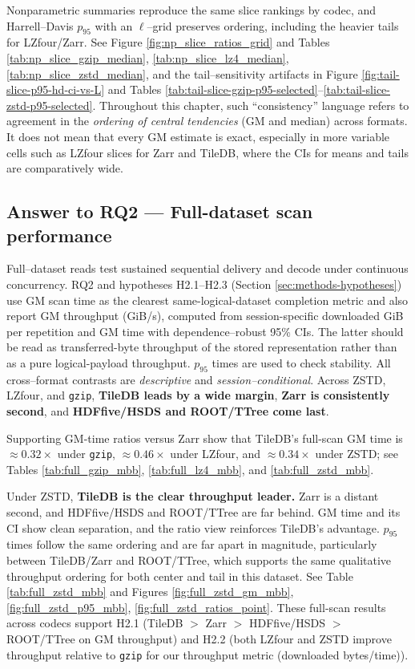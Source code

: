 \documentclass[nomenclature, english, bibtex]{kththesis}
\numberwithin{listing}{chapter}
\begin{document}
Nonparametric summaries reproduce the same slice rankings by codec, and Harrell–Davis $p_{95}$ with an $\ell$–grid preserves ordering, including the heavier tails for \gls{LZfour}/Zarr. See Figure \ref{fig:np_slice_ratios_grid} and Tables \ref{tab:np_slice_gzip_median}, \ref{tab:np_slice_lz4_median}, \ref{tab:np_slice_zstd_median}, and the tail–sensitivity artifacts in Figure \ref{fig:tail-slice-p95-hd-ci-vs-L} and Tables \ref{tab:tail-slice-gzip-p95-selected}–\ref{tab:tail-slice-zstd-p95-selected}. Throughout this chapter, such “consistency” language refers to agreement in the \emph{ordering of central tendencies} (\gls{GM} and median) across formats. It does not mean that every \gls{GM} estimate is exact, especially in more variable cells such as \gls{LZfour} slices for Zarr and TileDB, where the CIs for means and tails are comparatively wide.

\subsection{Answer to RQ2 — Full-dataset scan performance}
\label{sec:ans-rq2}
Full–dataset reads test sustained sequential delivery and decode under continuous concurrency. RQ2 and hypotheses H2.1–H2.3 (Section \ref{sec:methods-hypotheses}) use \gls{GM} scan time as the clearest same-logical-dataset completion metric and also report \gls{GM} throughput (GiB/s), computed from session-specific downloaded GiB per repetition and \gls{GM} time with dependence–robust 95\% \glspl{CI}. The latter should be read as transferred-byte throughput of the stored representation rather than as a pure logical-payload throughput. $p_{95}$ times are used to check stability. All cross–format contrasts are \emph{descriptive} and \emph{session–conditional}. Across \gls{ZSTD}, \gls{LZfour}, and \texttt{gzip}, \textbf{TileDB leads by a wide margin}, \textbf{Zarr is consistently second}, and \textbf{\gls{HDFfive}/\gls{HSDS} and \gls{ROOT}/\gls{TTree} come last}.

Supporting \gls{GM}-time ratios versus Zarr show that TileDB’s full-scan \gls{GM} time is $\approx 0.32\times$ under \texttt{gzip}, $\approx 0.46\times$ under \gls{LZfour}, and $\approx 0.34\times$ under \gls{ZSTD}; see Tables \ref{tab:full_gzip_mbb}, \ref{tab:full_lz4_mbb}, and \ref{tab:full_zstd_mbb}.

Under \gls{ZSTD}, \textbf{TileDB is the clear throughput leader.} Zarr is a distant second, and \gls{HDFfive}/\gls{HSDS} and \gls{ROOT}/\gls{TTree} are far behind. \gls{GM} time and its \gls{CI} show clean separation, and the ratio view reinforces TileDB’s advantage. $p_{95}$ times follow the same ordering and are far apart in magnitude, particularly between TileDB/Zarr and \gls{ROOT}/\gls{TTree}, which supports the same qualitative throughput ordering for both center and tail in this dataset. See Table \ref{tab:full_zstd_mbb} and Figures \ref{fig:full_zstd_gm_mbb}, \ref{fig:full_zstd_p95_mbb}, \ref{fig:full_zstd_ratios_point}. These full-scan results across codecs support H2.1 (TileDB $>$ Zarr $>$ \gls{HDFfive}/\gls{HSDS} $>$ \gls{ROOT}/\gls{TTree} on \gls{GM} throughput) and H2.2 (both \gls{LZfour} and \gls{ZSTD} improve throughput relative to \texttt{gzip} for our throughput metric (downloaded bytes/time)).
\end{document}
